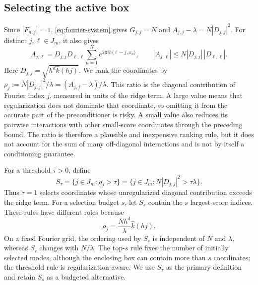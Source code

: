 \subsection{Selecting the active box}
\label{subsec:active-box-selection}

Since \(|F_{n,j}|=1\), \cref{eq:fourier-system} gives
\(G_{j,j}=N\) and \(A_{j,j}-\lambda=N|D_{j,j}|^2\). For distinct
\(j,\ell\in J_m\), it also gives
\[
    A_{j,\ell}
    =
    D_{j,j}D_{\ell,\ell}
    \sum_{n=1}^N
    e^{2\pi i h\langle \ell-j,x_n\rangle},
    \qquad
    |A_{j,\ell}|
    \leq
    N |D_{j,j}|\,|D_{\ell,\ell}|.
\]
Here \(D_{j,j}=\sqrt{h^d\widehat k(hj)}\). We rank the coordinates by
\(\rho_j:=N|D_{j,j}|^2/\lambda=(A_{j,j}-\lambda)/\lambda\). This ratio is the
diagonal contribution of Fourier index \(j\), measured in units of the ridge
term. A large value means that regularization does not dominate that
coordinate, so omitting it from the accurate part of the preconditioner is
risky. A small value also reduces its pairwise interactions with other
small-score coordinates through the preceding bound. The ratio is therefore a
plausible and inexpensive ranking rule, but it does not account for the sum of
many off-diagonal interactions and is not by itself a conditioning guarantee.

For a threshold \(\tau>0\), define
\begin{equation}
    S_\tau
    =\{j\in J_m:\rho_j>\tau\}
    =\{j\in J_m:N|D_{j,j}|^2>\tau\lambda\}.
    \label{eq:threshold-active-set}
\end{equation}
Thus \(\tau=1\) selects coordinates whose unregularized diagonal contribution
exceeds the ridge term. For a selection budget \(s\), let \(S_s\) contain the
\(s\) largest-score indices. These rules have different roles because
\begin{equation}
    \rho_j=\frac{Nh^d}{\lambda}\widehat k(hj).
    \label{eq:score-spectrum-form}
\end{equation}
On a fixed Fourier grid, the ordering used by \(S_s\) is independent of
\(N\) and \(\lambda\), whereas \(S_\tau\) changes with \(N/\lambda\).
The top-\(s\) rule fixes the number of initially selected modes, although the
enclosing box can contain more than \(s\) coordinates; the threshold rule is
regularization-aware. We use \(S_\tau\) as the primary definition and retain
\(S_s\) as a budgeted alternative.

